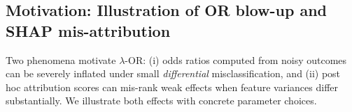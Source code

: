 \documentclass[pdflatex,sn-mathphys-num]{sn-jnl}%
\newcommand{\SPOR}{\textrm{$\lambda$-OR}}
\theoremstyle{thmstyleone}%
\theoremstyle{thmstyletwo}%
\theoremstyle{thmstylethree}%
\begin{document}



   



\subsection{Motivation: Illustration of OR blow-up and SHAP mis-attribution}

Two phenomena motivate $\SPOR$: (i) odds ratios computed from noisy outcomes can be severely inflated under small \emph{differential} misclassification, and (ii) post hoc attribution scores can mis-rank weak effects when feature variances differ substantially. We illustrate both effects with concrete parameter choices.
\end{document}
